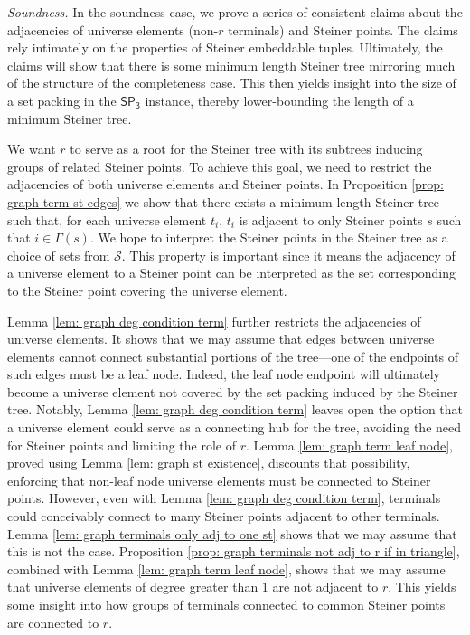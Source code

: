\documentclass{article}\providecommand{\DeclareRedundantLanguages}[2]{}\usepackage[a4paper,margin=20mm]{geometry}
\newcommand{\1}{\textbf{1}}
\newcommand{\setpT}{$\mathsf{SP_3}$\xspace}
\begin{document}
 

 \begin{paragraph}{\textit{Soundness.}}
 In the soundness case, we prove a series of consistent claims about the adjacencies of universe elements (non-$r$ terminals) and Steiner points. The claims rely intimately on the properties of Steiner embeddable tuples. Ultimately, the claims will show that there is some minimum length Steiner tree mirroring much of the structure of the completeness case. This then yields insight into the size of a set packing in the \setpT instance, thereby lower-bounding the length of a minimum Steiner tree.


We want $r$ to serve as a root for the Steiner tree with its subtrees inducing groups of related Steiner points. To achieve this goal, we need to restrict the adjacencies of both universe elements and Steiner points. In Proposition \ref{prop: graph term st edges} we show that there exists a minimum length Steiner tree such that, for each universe element $t_i$, $t_i$ is adjacent to only Steiner points $s$ such that $i \in \Gamma(s)$. We hope to interpret the Steiner points in the Steiner tree as a choice of sets from $\mathcal{S}$. This property is important since it means the adjacency of a universe element to a Steiner point can be interpreted as the set corresponding to the Steiner point covering the universe element.


Lemma \ref{lem: graph deg condition term} further restricts the adjacencies of universe elements. It shows that we may assume that edges between universe elements cannot connect substantial portions of the tree—one of the endpoints of such edges must be a leaf node. Indeed, the leaf node endpoint will ultimately become a universe element not covered by the set packing induced by the Steiner tree. Notably, Lemma \ref{lem: graph deg condition term} leaves open the option that a universe element could serve as a connecting hub for the tree, avoiding the need for Steiner points and limiting the role of $r$. Lemma \ref{lem: graph term leaf node}, proved using Lemma \ref{lem: graph st existence}, discounts that possibility, enforcing that non-leaf node universe elements must be connected to Steiner points.  However, even with Lemma \ref{lem: graph deg condition term}, terminals could conceivably connect to many Steiner points adjacent to other terminals. Lemma \ref{lem: graph terminals only adj to one st} shows that we may assume that this is not the case. Proposition \ref{prop: graph terminals not adj to r if in triangle}, combined with Lemma \ref{lem: graph term leaf node}, shows that we may assume that universe elements of degree greater than $1$ are not adjacent to $r$. This yields some insight into how groups of terminals connected to common Steiner points are connected to $r$.


\end{paragraph}
\end{document}
